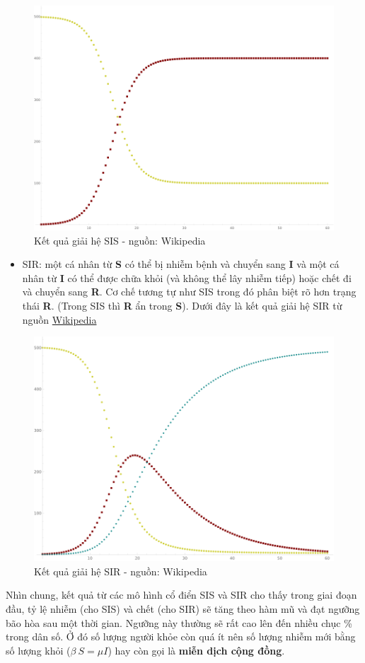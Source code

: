 \documentclass[]{book}
\providecommand{\tightlist}{%
  \setlength{\itemsep}{0pt}\setlength{\parskip}{0pt}}
\begin{document}
\begin{figure}

{\centering \includegraphics[width=0.5\linewidth]{images/SIS} 

}

\caption{Kết quả giải hệ SIS - nguồn: Wikipedia}\label{fig:SIS}
\end{figure}

\begin{itemize}
\tightlist
\item
  SIR: một cá nhân từ \textbf{S} có thể bị nhiễm bệnh và chuyển sang
  \textbf{I} và một cá nhân từ \textbf{I} có thể được chữa khỏi (và
  không thể lây nhiễm tiếp) hoặc chết đi và chuyển sang \textbf{R}. Cơ
  chế tương tự như SIS trong đó phân biệt rõ hơn trạng thái \textbf{R}.
  (Trong SIS thì \textbf{R} ẩn trong \textbf{S}). Dưới đây là kết quả
  giải hệ SIR từ nguồn
  \href{https://en.wikipedia.org/wiki/Compartmental_models_in_epidemiology}{Wikipedia}
\end{itemize}

\begin{figure}

{\centering \includegraphics[width=0.5\linewidth]{images/SIR} 

}

\caption{Kết quả giải hệ SIR - nguồn: Wikipedia}\label{fig:SIR}
\end{figure}

Nhìn chung, kết quả từ các mô hình cổ điển SIS và SIR cho thấy trong
giai đoạn đầu, tỷ lệ nhiễm (cho SIS) và chết (cho SIR) sẽ tăng theo hàm
mũ và đạt ngưỡng bão hòa sau một thời gian. Ngưỡng này thường sẽ rất cao
lên đến nhiều chục \% trong dân số. Ở đó số lượng người khỏe còn quá ít
nên số lượng nhiễm mới bằng số lượng khỏi (\(\beta\ S = \mu I\)) hay còn
gọi là \textbf{miễn dịch cộng đồng}.
\end{document}
